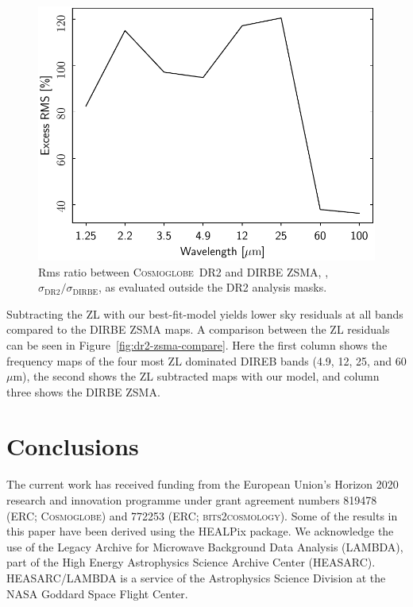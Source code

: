 \documentclass[twocolumn]{aa}
\newcommand{\cosmoglobe}{\textsc{Cosmoglobe}}
\begin{document}
\begin{figure}
    \centering
    \includegraphics[width=\linewidth]{figs/zodi_rms_ratio_DIRBE_DR2.pdf}
    \caption{Rms ratio between \cosmoglobe\ DR2 and DIRBE ZSMA, ,
      $\sigma_{\mathrm{DR2}}/\sigma_\mathrm{DIRBE}$,
      as evaluated outside the DR2 analysis masks.}
    \label{fig:zsma_rms}
\end{figure}



Subtracting the ZL with our best-fit-model yields lower sky residuals at all bands 
compared to the DIRBE ZSMA maps. A comparison between the ZL residuals can be seen 
in Figure~\ref{fig:dr2-zsma-compare}. Here the first column shows the frequency maps of the
four most ZL dominated DIREB bands (4.9, 12, 25, and 60 $\mu$m), the second shows the ZL
subtracted maps with our model, and column three shows the DIRBE ZSMA.


\section{Conclusions}
\label{sec:conclusions}


\begin{acknowledgements}
 The current work has received funding from the European
  Union’s Horizon 2020 research and innovation programme under grant
  agreement numbers 819478 (ERC; \textsc{Cosmoglobe}) and 772253 (ERC;
  \textsc{bits2cosmology}). Some of the results in this paper have been 
  derived using the HEALPix \citep{Gorski2005} package.
  We acknowledge the use of the Legacy Archive for Microwave Background 
  Data
  Analysis (LAMBDA), part of the High Energy Astrophysics Science
  Archive Center
  (HEASARC). HEASARC/LAMBDA is a service of the Astrophysics Science 
  Division at the NASA Goddard Space Flight Center.  
\end{acknowledgements}
\end{document}
